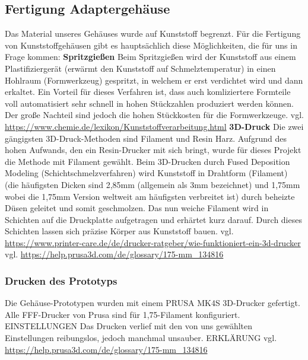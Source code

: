 \documentclass[]{article}
\begin{document}
\subsection{Fertigung Adaptergehäuse}
Das Material unseres Gehäuses wurde auf Kunststoff begrenzt. Für die Fertigung von Kunststoffgehäusen gibt es hauptsächlich diese Möglichkeiten, die für uns in Frage kommen:
\vspace{4mm}\newline
\textbf{Spritzgießen} \newline
\glqq Beim Spritzgießen wird der Kunststoff aus einem Plastifiziergerät (erwärmt den Kunststoff auf Schmelztemperatur) in einen Hohlraum (Formwerkzeug) gespritzt, in welchem er erst verdichtet wird und dann erkaltet.\grqq \newline 
Ein Vorteil für dieses Verfahren ist, dass auch komliziertere Formteile voll automatisiert sehr schnell in hohen Stückzahlen produziert werden können.
Der große Nachteil sind jedoch die hohen Stückkosten für die Formwerkzeuge.\vspace{4mm}\newline 
vgl. \url{https://www.chemie.de/lexikon/Kunststoffverarbeitung.html}
\vspace{4mm}\newline
\textbf{3D-Druck} \newline
Die zwei gängigsten 3D-Druck-Methoden sind Filament und Resin Harz. Aufgrund des hohen Aufwands, den ein Resin-Drucker mit sich bringt, wurde für dieses Projekt die Methode mit Filament gewählt. \newline
Beim 3D-Drucken durch Fused Deposition Modeling (Schichtschmelzverfahren) wird Kunststoff in Drahtform (Filament) (die häufigsten Dicken sind 2,85mm (allgemein als 3mm bezeichnet) und 1,75mm wobei die 1,75mm Version weltweit am häufigsten verbreitet ist) durch beheizte Düsen geleitet und somit geschmolzen. Das nun weiche Filament wird in Schichten auf die Druckplatte aufgetragen und erhärtet kurz darauf. Durch dieses Schichten lassen sich präzise Körper aus Kunststoff bauen.
\vspace{4mm}\newline
vgl. \url{https://www.printer-care.de/de/drucker-ratgeber/wie-funktioniert-ein-3d-drucker}\newline
vgl. \url{https://help.prusa3d.com/de/glossary/175-mm_134816}

\subsubsection{Drucken des Prototyps}
Die Gehäuse-Prototypen wurden mit einem \glqq PRUSA MK4S\grqq{} 3D-Drucker gefertigt. Alle FFF-Drucker von Prusa sind für 1,75-Filament konfiguriert. EINSTELLUNGEN
Das Drucken verlief mit den von uns gewählten Einstellungen reibungslos, jedoch manchmal unsauber. ERKLÄRUNG
\vspace{4mm}\newline
vgl. \url{https://help.prusa3d.com/de/glossary/175-mm_134816}
\end{document}
